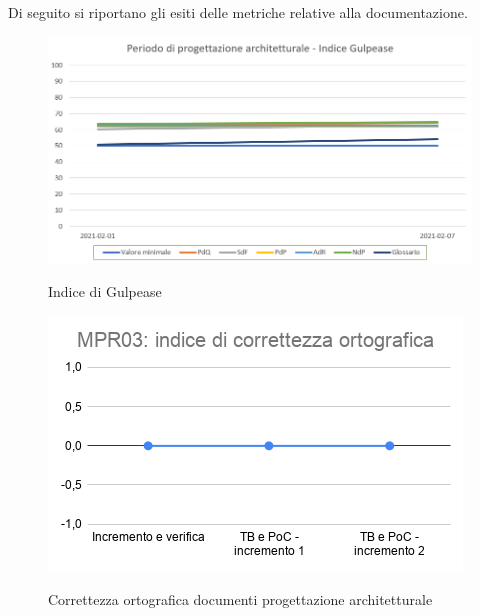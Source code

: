 Di seguito si riportano gli esiti delle metriche relative alla documentazione.
\begin{figure}[h]
	\centering
	\includegraphics[scale=0.5]{Immagini/GulpeaseProgettazioneArchitetturale}\\
	\caption{Indice di Gulpease}
	\label{fig:GulpeasePArchitetturale}
\end{figure}
\begin{figure}[h]
	\centering
	\includegraphics[scale=0.6]{Immagini/MPR03_cortografica}\\
	\caption{Correttezza ortografica documenti progettazione architetturale}
	\label{fig:CortOrtograficaPArchitetturale}
\end{figure}
